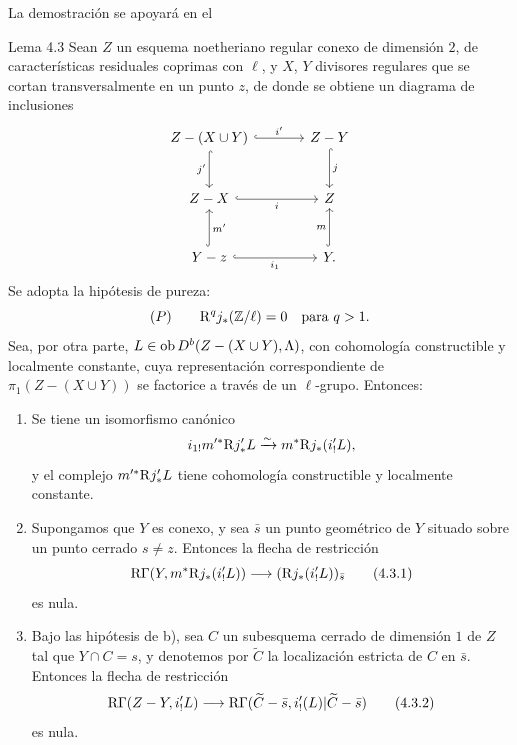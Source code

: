 La demostración se apoyará en el

\begin{statement}{Lema 4.3}
Sean $Z$ un esquema noetheriano regular conexo de dimensión $2$, de características residuales coprimas con $\ell$, y $X$, $Y$ divisores regulares que se cortan transversalmente en un punto $z$, de donde se obtiene un diagrama de inclusiones
\[
\begin{tikzcd}[column sep=large,row sep=large]
Z-(X\cup Y) \arrow[r,hook,"i'"] \arrow[d,hook,"j'"'] & Z-Y \arrow[d,hook,"j"]\\
Z-X \arrow[r,hook,"i"'] & Z\\
Y-z \arrow[r,hook,"i_1"'] \arrow[u,hook,"m'"'] & Y \arrow[u,hook,"m"] .
\end{tikzcd}
\]
Se adopta la hipótesis de pureza:
\[
(P)\qquad \mathrm{R}^qj_*(\mathbb Z/\ell)=0\quad\text{para }q>1.
\]
Sea, por otra parte, $L\in\operatorname{ob} D^b(Z-(X\cup Y),\Lambda)$, con cohomología constructible y localmente constante, cuya representación correspondiente de $\pi_1(Z-(X\cup Y))$ se factorice a través de un $\ell$-grupo. Entonces:
\begin{enumerate}[label=\alph*)]
\item Se tiene un isomorfismo canónico
\[
i_{1!}m'^*\mathrm{R} j'_*L\xrightarrow{\sim} m^*\mathrm{R} j_*(i'_!L),
\]
y el complejo $m'^*\mathrm{R} j'_*L$ tiene cohomología constructible y localmente constante.
\item Supongamos que $Y$ es conexo, y sea $\bar s$ un punto geométrico de $Y$ situado sobre un punto cerrado $s\ne z$. Entonces la flecha de restricción
\begin{equation}
\mathrm{R}\Gamma(Y,m^*\mathrm{R} j_*(i'_!L))\longrightarrow (\mathrm{R} j_*(i'_!L))_{\bar s}
\tag{4.3.1}
\end{equation}
es nula.
\item Bajo las hipótesis de b), sea $C$ un subesquema cerrado de dimensión $1$ de $Z$ tal que $Y\cap C=s$, y denotemos por $\widetilde C$ la localización estricta de $C$ en $\bar s$. Entonces la flecha de restricción
\begin{equation}
\mathrm{R}\Gamma(Z-Y,i'_!L)
\longrightarrow
\mathrm{R}\Gamma(\widetilde C-\bar s,i'_!(L)|\widetilde C-\bar s)
\tag{4.3.2}
\end{equation}
es nula.
\end{enumerate}
\end{statement}
